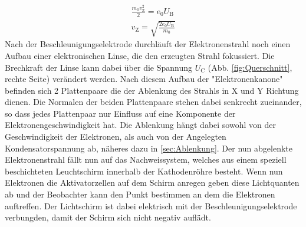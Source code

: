 \begin{align}
    \frac{ m_0 v_{\text{Z}}^2}{2}= e_0 U_{\text{B}} \nonumber \\
    v_{\text{Z}} = \sqrt{\frac{2 e_0 U_{\text{B}}}{m_0}} \label{eqn:Beschleunigung}
\end{align}
Nach der Beschleunigungselektrode durchläuft der Elektronenstrahl noch einen Aufbau einer elektronischen Linse, die den erzeugten Strahl fokussiert.
Die Brechkraft der Linse kann dabei über die Spannung $U_{\text{C}}$ (Abb. \ref{fig:Querschnitt}, rechte Seite) verändert werden.
Nach diesem Aufbau der "Elektronenkanone" befinden sich 2 Plattenpaare die der Ablenkung des Strahls in X und Y Richtung dienen.
Die Normalen der beiden Plattenpaare stehen dabei senkrecht zueinander, so dass jedes Plattenpaar nur Einfluss auf eine Komponente der Elektronengeschwindigkeit hat.
Die Ablenkung hängt dabei sowohl von der Geschwindigkeit der Elektronen, als auch von der Angelegten Kondensatorspannung ab, näheres dazu in \ref{sec:Ablenkung}.
Der nun abgelenkte Elektronenstrahl fällt nun auf das Nachweissystem, welches aus einem speziell beschichteten Leuchtschirm innerhalb der Kathodenröhre besteht.
Wenn nun Elektronen die Aktivatorzellen auf dem Schirm anregen geben diese Lichtquanten ab und der Beobachter kann den Punkt bestimmen an dem die Elektronen auftreffen.
Der Lichtschirm ist dabei elektrisch mit der Beschleunigungselektrode verbungden, damit der Schirm sich nicht negativ auflädt.
